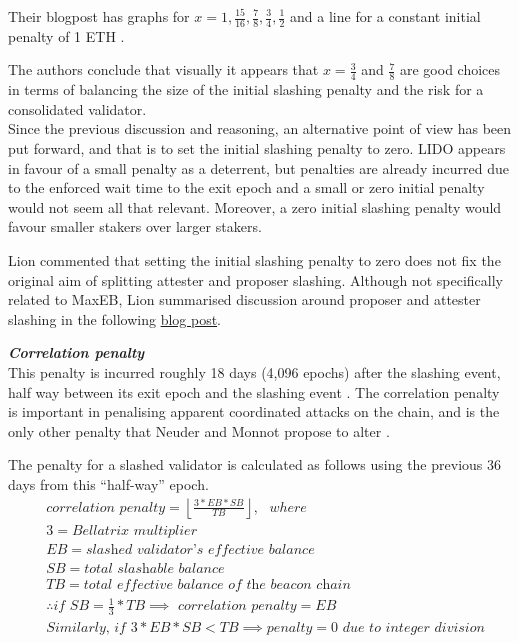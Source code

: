 Their blogpost has graphs for $x=1, \frac{15}{16}, \frac{7}{8}, \frac{3}{4}, \frac{1}{2}$ and a line for a constant initial penalty of 1 ETH \cite{Neuder2023d}.

The authors conclude that visually it appears that $x = \frac{3}{4}$ and $\frac{7}{8}$ are good choices in terms of balancing the size of the initial slashing penalty and the risk for a consolidated validator.\\

Since the previous discussion and reasoning, an alternative point of view has been put forward, and that is to set the initial slashing penalty to zero. LIDO appears in favour of a small penalty as a deterrent, but penalties are already incurred due to the enforced wait time to the exit epoch and a small or zero initial penalty would not seem all that relevant. Moreover, a zero initial slashing penalty would favour smaller stakers over larger stakers.

Lion commented that setting the initial slashing penalty to zero does not fix the original aim of splitting attester and proposer slashing.  Although not specifically related to MaxEB, Lion summarised discussion around proposer and attester slashing in the following \href{https://docs.google.com/document/d/1mOc5nokVm3jx4bCffTuQ_xjYV4zVlDLPI-KEhFWWP78/edit}{blog post}.

\noindent
\textbf{\textit{Correlation penalty}} \\
This penalty is incurred roughly 18 days (4,096 epochs) after the slashing event, half way between its exit epoch and the slashing event \cite{Edgington2023}. The correlation penalty is important in penalising apparent coordinated attacks on the chain, and is the only other penalty that Neuder and Monnot propose to alter \cite{Neuder2023d}.

The penalty for a slashed validator is calculated as follows using the previous 36 days from this ``half-way'' epoch.
\begin{equation*}
\begin{split}
& \textit{correlation penalty} = \left\lfloor \frac{3*EB*SB}{TB} \right\rfloor, \texttt{ } where \\
& 3 = \textit{Bellatrix multiplier} \\
& EB = \textit{slashed validator's effective balance} \\
& SB = \textit{total slashable balance} \\
& TB = \textit{total effective balance of the beacon chain} \\
& \therefore \textit{if SB} = \frac{1}{3} * TB \implies \textit{ correlation penalty} = EB \\
& \textit{Similarly, if } 3*EB*SB <  TB \implies penalty = 0 \textit{ due to integer division} \\
\end{split}
\end{equation*}

